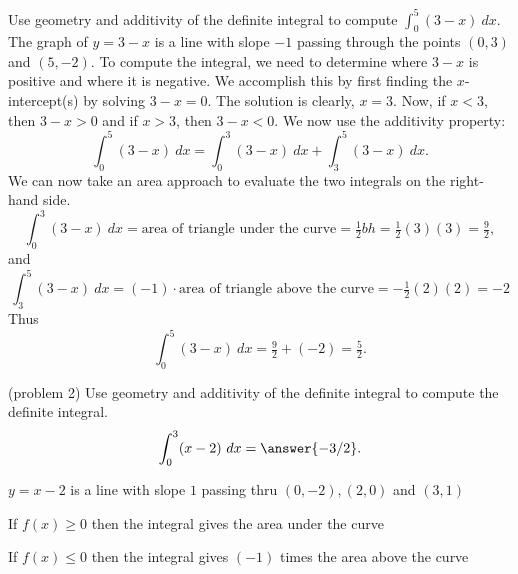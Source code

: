 \documentclass{ximera}
\begin{document}
\begin{example}[example 2]
Use geometry and additivity of the definite integral to compute  
$\displaystyle{\int_0^5  (3-x)  \ dx}$.
The graph of $y = 3-x$ is a line with slope $-1$ passing through the points $(0,3)$ and $(5,-2)$. To compute the integral,
we need to determine where $3-x$ is positive and where it is negative. We accomplish this by first finding the $x$-intercept(s)
by solving $3-x = 0$.  The solution is clearly, $x = 3$.  Now, if $x < 3$, then $3 - x >0$ and if
$x >3$, then $3-x <0$.
We now use the additivity property:
\[\int_0^5 (3-x) \ dx = \int_0^3 (3-x) \ dx  + \int_3^5 (3-x) \ dx.\]
We can now take an area approach to evaluate the two integrals on the right-hand side.
\[\int_0^3 (3-x) \ dx = \text{area of triangle under the curve} = \tfrac12bh = \tfrac12(3)(3) = \tfrac92,\]
and
\[\int_3^5 (3-x) \ dx = (-1)\cdot\text{area of triangle above the curve} = -\tfrac12(2)(2) = -2\]
Thus
\[\int_0^5 (3-x) \ dx = \tfrac92  + (-2) = \tfrac52.\]


\begin{image}
\end{image}

\end{example}


\begin{problem}(problem 2)
Use geometry and additivity of the definite integral to compute the definite integral.  
\[\int_0^3  (x-2)  \ dx= \answer{-3/2}.\]
\begin{hint}
$y=x-2$ is a line with slope $1$ passing thru $(0,-2), (2,0)$ and $(3,1)$
\end{hint}
\begin{hint}
If $f(x) \geq 0$ then the integral gives the area under the curve
\end{hint}
\begin{hint}
If $f(x) \leq 0$ then the integral gives $(-1)$ times the area above the curve
\end{hint}

\end{problem}
\end{document}
